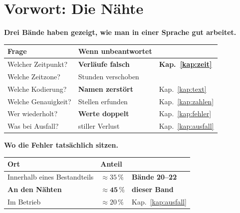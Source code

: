 \chapter*{Vorwort: Die Nähte}

\textbf{Drei Bände haben gezeigt, wie man in einer Sprache gut arbeitet.} 

\begin{merksatz}
\begin{center}
{\small
\renewcommand{\arraystretch}{1.5}
\begin{tabular}{@{}P{2.8cm}P{3.0cm}P{2.4cm}@{}}
\toprule
\textbf{Frage} & \textbf{Wenn unbeantwortet} & \\
\midrule
Welcher Zeitpunkt? & \textcolor{akzent}{\textbf{Verläufe falsch}} & \textbf{Kap.~\ref{kap:zeit}}\\
Welche Zeitzone? & \textcolor{akzent}{Stunden verschoben} & \\
Welche Kodierung? & \textcolor{akzent}{\textbf{Namen zerstört}} & Kap.~\ref{kap:text}\\
Welche Genauigkeit? & \textcolor{akzent}{Stellen erfunden} & Kap.~\ref{kap:zahlen}\\
Wer wiederholt? & \textcolor{akzent}{\textbf{Werte doppelt}} & Kap.~\ref{kap:fehler}\\
Was bei Ausfall? & \textcolor{akzent}{stiller Verlust} & Kap.~\ref{kap:ausfall}\\
\bottomrule
\end{tabular}}
\end{center}

\begin{center}
\begin{minipage}{0.88\textwidth}
\end{minipage}
\end{center}

\textbf{Wo die Fehler tatsächlich sitzen.}

\begin{center}
\renewcommand{\arraystretch}{1.5}
\begin{tabular}{@{}P{3.0cm}P{2.2cm}P{2.8cm}@{}}
\toprule
\textbf{Ort} & \textbf{Anteil} & \\
\midrule
Innerhalb eines Bestandteils & $\approx35\,\%$ & \textbf{Bände 20--22}\\
\textbf{An den Nähten} & \textcolor{akzent}{$\approx\mathbf{45\,\%}$} & \textcolor{akzent}{\textbf{dieser Band}}\\
Im Betrieb & $\approx20\,\%$ & Kap.~\ref{kap:ausfall}\\
\bottomrule
\end{tabular}
\end{center}


\end{merksatz}
